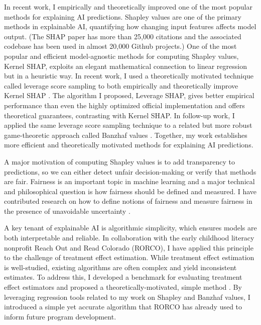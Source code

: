 \documentclass[11pt]{article}
\begin{document}
{In recent work, I empirically and theoretically improved one of the most popular methods for explaining AI predictions. Shapley values are one of the primary methods in explainable AI, quantifying how changing input features affects model output. (The SHAP paper has more than 25,000 citations and the associated codebase has been used in almost 20,000 Github projects.) One of the most popular and efficient model-agnostic methods for computing Shapley values, Kernel SHAP, exploits an elegant mathematical connection to linear regression but in a heuristic way. In recent work, I used a theoretically motivated technique called leverage score sampling to both empirically and theoretically improve Kernel SHAP \cite{musco2024leverage}. The algorithm I proposed, Leverage SHAP, gives better empirical performance than even the highly optimized official implementation and offers theoretical guarantees, contrasting with Kernel SHAP. In follow-up work, I applied the same leverage score sampling technique to a related but more robust game-theoretic approach called Banzhaf values \cite{liu2024kernel}. Together, my work establishes more efficient and theoretically motivated methods for explaining AI predictions.

A major motivation of computing Shapley values is to add transparency to predictions, so we can either detect unfair decision-making or verify that methods are fair. Fairness is an important topic in machine learning and a major technical and philosophical question is how fairness should be defined and measured. I have contributed research on how to define notions of fairness \cite{rosenblatt2023counterfactual} and measure fairness in the presence of unavoidable uncertainty \cite{witter2024fairlyuncertain}.

A key tenant of explainable AI is algorithmic simplicity, which ensures models are both interpretable and reliable. In collaboration with the early childhood literacy nonprofit Reach Out and Read Colorado (RORCO), I have applied this principle to the challenge of treatment effect estimation. While treatment effect estimation is well-studied, existing algorithms are often complex and yield inconsistent estimates. To address this, I developed a benchmark for evaluating treatment effect estimators and proposed a theoretically-motivated, simple method \cite{witter2024benchmarking}. By leveraging regression tools related to my work on Shapley and Banzhaf values, I introduced a simple yet accurate algorithm that RORCO has already used to inform future program development.

}
\end{document}
